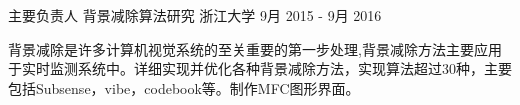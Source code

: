 


\begin{cventries}


\cventry
{主要负责人} %
{背景减除算法研究} %
{浙江大学} %
{9月 2015 - 9月 2016} %
{ %
\begin{cvitems}
\item {背景减除是许多计算机视觉系统的至关重要的第一步处理,背景减除方法主要应用于实时监测系统中。详细实现并优化各种背景减除方法，实现算法超过30种，主要包括Subsense，vibe，codebook等。制作MFC图形界面。}
\end{cvitems}
}

\end{cventries}